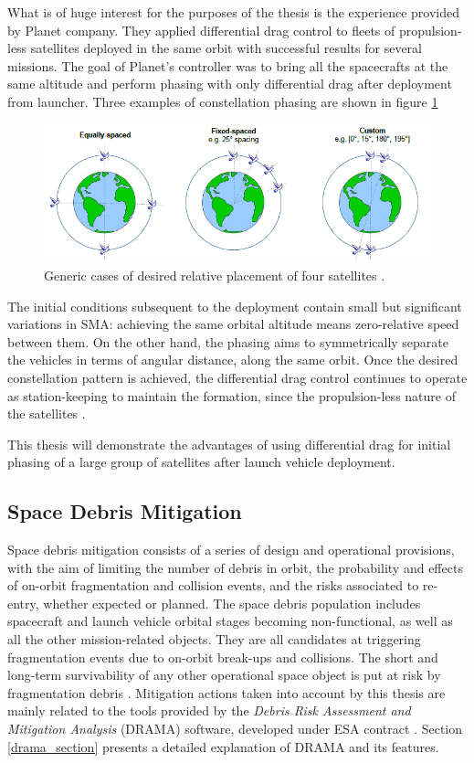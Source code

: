 What is of huge interest for the purposes of the thesis is the experience provided by Planet company.
They applied differential drag control to fleets of propulsion-less satellites deployed in the same orbit with successful results for several missions.
The goal of Planet's controller was to bring all the spacecrafts at the same altitude and perform phasing with only differential drag after deployment from launcher.
Three examples of constellation phasing are shown in figure \ref{phasing_examples_figure}
\begin{figure}[h]
    \centering
    \includegraphics[scale=1]{img/phasing_examples.png}
    \caption{Generic cases of desired relative placement of four satellites \cite{foster2018differential}.}
    \label{phasing_examples_figure}
\end{figure}
The initial conditions subsequent to the deployment contain small but significant variations in SMA: achieving the same orbital altitude means zero-relative speed between them.
On the other hand, the phasing aims to symmetrically separate the vehicles in terms of angular distance, along the same orbit. 
Once the desired constellation pattern is achieved, the differential drag control continues to operate as station-keeping to maintain the formation, since the propulsion-less nature of the satellites \cite{foster2018differential}.

This thesis will demonstrate the advantages of using differential drag for initial phasing of a large group of satellites after launch vehicle deployment. 

\subsection{Space Debris Mitigation} \label{space_debris_mitigation}
Space debris mitigation consists of a series of design and operational provisions, with the aim of limiting the number of debris in orbit, the probability and effects of on-orbit fragmentation and collision events, and the risks associated to re-entry, whether expected or planned.
The space debris population includes spacecraft and launch vehicle orbital stages becoming non-functional, as well as all the other mission-related objects.
They are all candidates at triggering fragmentation events due to on-orbit break-ups and collisions.
The short and long-term survivability of any other operational space object is put at risk by fragmentation debris \cite{esa2023debrisguidelines}.
Mitigation actions taken into account by this thesis are mainly related to the tools provided by the \textit{Debris Risk Assessment and Mitigation Analysis} (DRAMA) software, developed under ESA contract \cite{braun2013drama}.
Section \ref{drama_section} presents a detailed explanation of DRAMA and its features. 

